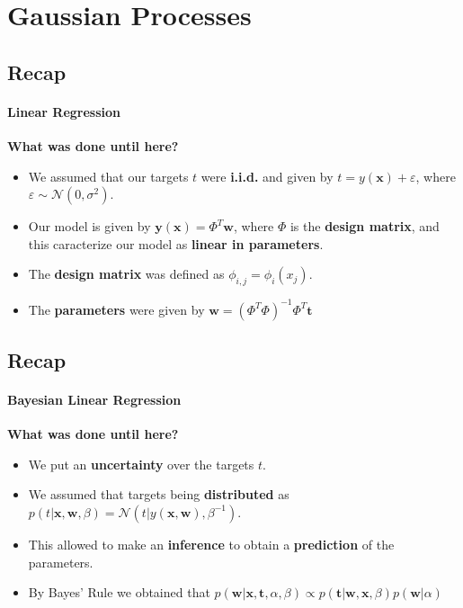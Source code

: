 \section{Gaussian Processes}
\framecard{\insertsection}

\subsection{Recap}
\begin{frame}{\insertsubsection}
    \framesubtitle{Linear Regression} 

    \textcolor{UniGold}{\textbf{What was done until here?}}
    \begin{itemize}
        \item We assumed that our targets $t$ were \textcolor{UniOrange}{\textbf{i.i.d.}} and given by $t = y(\mathbf{x}) + \varepsilon$, where $\varepsilon \sim \mathcal{N}(0,\sigma^2)$.
        \item Our model is given by $\mathbf{y}(\mathbf{x}) = \Phi^T \mathbf{w}$, where $\Phi$ is the \textcolor{UniOrange}{\textbf{design matrix}}, and this caracterize our model as \textcolor{UniOrange}{\textbf{linear in parameters}}.
        \item The \textcolor{UniOrange}{\textbf{design matrix}} was defined as $ \phi_{i,j} = \phi_i(x_j)$.
        \item The \textcolor{UniOrange}{\textbf{parameters}} were given by $\mathbf{w} = \left( \Phi^T \Phi \right)^{-1}\Phi^T \mathbf{t} $
    \end{itemize}

\end{frame}

\subsection{Recap}
\begin{frame}{\insertsubsection}
    \framesubtitle{Bayesian Linear Regression} 

    \textcolor{UniGold}{\textbf{What was done until here?}}
    \begin{itemize}
        \item We put an \textcolor{UniOrange}{\textbf{uncertainty}} over the targets $t$.
        \item We assumed that targets being \textcolor{UniOrange}{\textbf{distributed}} as $p( t| \mathbf{x}, \mathbf{w}, \beta) = \mathcal{N} ( t | y(\mathbf{x}, \mathbf{w}), \beta^{-1})$.
        \item This allowed to make an \textcolor{UniOrange}{\textbf{inference}} to obtain a \textcolor{UniOrange}{\textbf{prediction}} of the parameters.
        \item By Bayes' Rule we obtained that $p\left( \mathbf{w} | \mathbf{x}, \mathbf{t}, \alpha, \beta \right) \propto p\left(  \mathbf{t} |\mathbf{w} ,\mathbf{x}, \beta \right) p\left( \mathbf{w} | \alpha \right)$
    \end{itemize}

\end{frame}